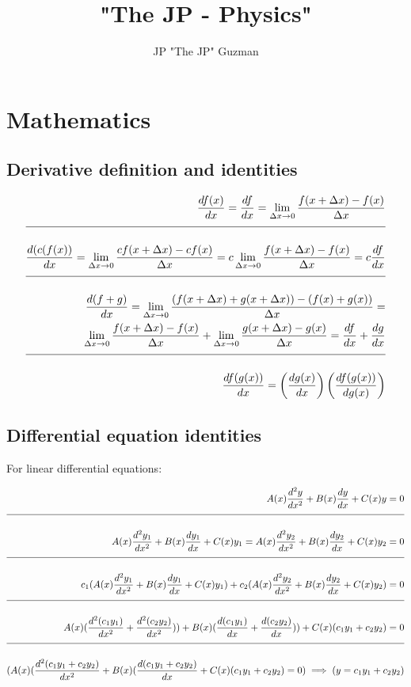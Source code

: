 \documentclass[a4paper]{article}
\title{"The JP - Physics"}
\author{JP "The JP" Guzman}
\newcommand{\n}{\\[1.5ex] \hline \nonumber \\[0ex]}
\newcommand{\m}{\nonumber \\}
\begin{document}
\maketitle
\allowdisplaybreaks

\section{Mathematics}
\subsection{Derivative definition and identities}
\begin{tcolorbox}
\begin{align}
   \frac{df(x)}{dx} = \frac{df}{dx} = \lim_{\Delta x \to 0} \frac{f(x + \Delta x) - f(x)}{\Delta x}
\n \frac{d(c(f(x))}{dx} = \lim_{\Delta x \to 0} \frac{c f(x + \Delta x) - c f(x)}{\Delta x} = c \lim_{\Delta x \to 0} \frac{f(x + \Delta x) - f(x)}{\Delta x} = c \frac{df}{dx}
\n \frac{d(f+g)}{dx} = \lim_{\Delta x \to 0} \frac{(f(x + \Delta x) + g(x + \Delta x)) - (f(x) + g(x))}{\Delta x} =
\m \lim_{\Delta x \to 0} \frac{f(x + \Delta x) - f(x)}{\Delta x} + \lim_{\Delta x \to 0} \frac{g(x + \Delta x) - g(x)}{\Delta x} = \frac{df}{dx} + \frac{dg}{dx}
\n \frac{df(g(x))}{dx} = \left(\frac{dg(x)}{dx}\right) \left(\frac{{df(g(x))}}{dg(x)}\right)
\end{align}
\end{tcolorbox}

\subsection{Differential equation identities}
For linear differential equations:
\begin{tcolorbox}
\begin{align}
   A(x) \frac{d^2y}{dx^2} + B(x) \frac{dy}{dx} + C(x) y = 0
\n A(x) \frac{d^2y_1}{dx^2} + B(x) \frac{dy_1}{dx} + C(x) y_1 = A(x) \frac{d^2y_2}{dx^2} + B(x) \frac{dy_2}{dx} + C(x) y_2 = 0
\n c_1 (A(x) \frac{d^2y_1}{dx^2} + B(x) \frac{dy_1}{dx} + C(x) y_1) + c_2 (A(x) \frac{d^2y_2}{dx^2} + B(x) \frac{dy_2}{dx} + C(x) y_2) = 0
\n A(x) (\frac{d^2(c_1 y_1)}{dx^2} + \frac{d^2(c_2 y_2)}{dx^2})) + B(x) (\frac{d(c_1 y_1)}{dx} + \frac{d(c_2 y_2)}{dx})) + C(x) (c_1 y_1 + c_2 y_2) = 0
\n (A(x) (\frac{d^2(c_1 y_1+ c_2 y_2)}{dx^2} + B(x) (\frac{d(c_1 y_1 + c_2 y_2)}{dx} + C(x) (c_1 y_1 + c_2 y_2) = 0) \implies (y = c_1 y_1 + c_2 y_2)
\end{align}
\end{tcolorbox}
\end{document}
